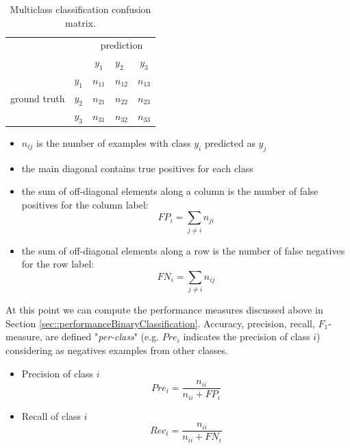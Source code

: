 \begin{table}[ht]
	\centering
	\begin{tabular}{cc|clc|}
		\cline{3-5}                                         &                              & \multicolumn{3}{c|}{prediction} \\
		\cline{3-5}                                         &                              & \multicolumn{1}{c|}{$y_{1}$}   & \multicolumn{1}{l|}{$y_{2}$}  & $y_{3}$                       \\
		\hline
		\multicolumn{1}{|c|}{\multirow{3}{*}{ground truth}} & $y_{1}$                      & \multicolumn{1}{c|}{$n_{11}$}  & \multicolumn{1}{l|}{$n_{12}$} & $n_{13}$                      \\
		\cline{2-5} \multicolumn{1}{|c|}{}                  & \multicolumn{1}{l|}{$y_{2}$} & \multicolumn{1}{l|}{$n_{21}$}  & \multicolumn{1}{l|}{$n_{22}$} & \multicolumn{1}{l|}{$n_{23}$} \\
		\cline{2-5} \multicolumn{1}{|c|}{}                  & $y_{3}$                      & \multicolumn{1}{c|}{$n_{31}$}  & \multicolumn{1}{l|}{$n_{32}$} & $n_{33}$                      \\
		\hline
	\end{tabular}
	\caption{Multiclass classification confusion matrix.}
	\label{fig:confisionMatrixMulticlassClassification}
\end{table}

\begin{itemize}
	\item $n_{ij}$ is the number of examples with class $y_{i}$ predicted as $y_{j}$

	\item the main diagonal contains true positives for each class

	\item the sum of off-diagonal elements along a column is the number of false positives
		for the column label:
		\[
			\mathit{FP}_{i}= \sum_{j \neq i}n_{ji}
		\]

	\item the sum of off-diagonal elements along a row is the number of false negatives
		for the row label:
		\[
			\mathit{FN}_{i}= \sum_{j \neq i}n_{ij}
		\]
\end{itemize}

At this point we can compute the performance measures discussed above in Section
\ref{sec::performanceBinaryClassification}. Accuracy, precision, recall, $F_{1}$-measure,
are defined "\textit{per-class}" (e.g. $\mathit{Pre}_{i}$ indicates the
precision of class $i$) considering as negatives examples from other classes.
\begin{itemize}
	\item Precision of class $i$
		\[
			\textit{Pre}_{i}= \frac{n_{ii}}{n_{ii}+\textit{FP}_{i}}
		\]

	\item Recall of class $i$
		\[
			\textit{Rec}_{i}= \frac{n_{ii}}{n_{ii}+\mathit{FN}_{i}}
		\]
\end{itemize}

